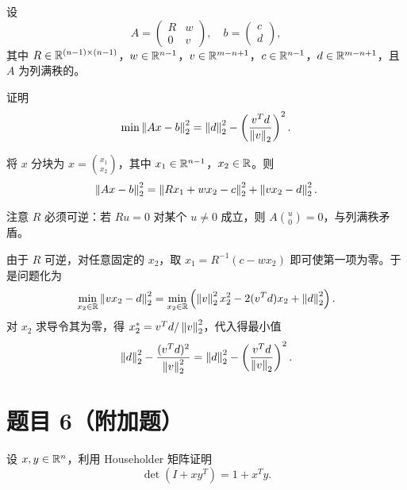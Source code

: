 \documentclass{article}
\begin{document}
设
\[
  A =
  \begin{pmatrix} R & w \\ 0 & v
  \end{pmatrix}, \quad
  b =
  \begin{pmatrix} c \\ d
  \end{pmatrix},
\]
其中 $R \in \mathbb{R}^{(n-1) \times (n-1)}$，$w \in \mathbb{R}^{n-1}$，$v \in
\mathbb{R}^{m-n+1}$，$c \in \mathbb{R}^{n-1}$，$d \in \mathbb{R}^{m-n+1}$，且 $A$ 为列满秩的。

证明
\[
  \min \left\| Ax - b \right\|_2^2 = \left\| d \right\|_2^2 - \left(\frac{v^T
  d}{\left\| v \right\|_2}\right)^2.
\]

\begin{solution}

  将 $x$ 分块为 $x = \binom{x_1}{x_2}$，其中 $x_1 \in \mathbb{R}^{n-1}$，$x_2 \in \mathbb{R}$。则
  \[
    \left\| Ax - b \right\|_2^2 = \left\| Rx_1 + wx_2 - c \right\|_2^2 + \left\| vx_2 - d \right\|_2^2.
  \]

  注意 $R$ 必须可逆：若 $Ru = 0$ 对某个 $u \neq 0$ 成立，则 $A\binom{u}{0} = 0$，与列满秩矛盾。

  由于 $R$ 可逆，对任意固定的 $x_2$，取 $x_1 = R^{-1}(c - wx_2)$ 即可使第一项为零。于是问题化为
  \[
    \min_{x_2 \in \mathbb{R}} \left\| vx_2 - d \right\|_2^2
    = \min_{x_2 \in \mathbb{R}} \left( \left\| v \right\|_2^2 x_2^2 - 2(v^T d) x_2 +
    \left\| d \right\|_2^2 \right).
  \]
  对 $x_2$ 求导令其为零，得 $x_2^* = v^T d / \left\| v \right\|_2^2$，代入得最小值
  \[
    \left\| d \right\|_2^2 - \frac{(v^T d)^2}{\left\| v \right\|_2^2}
    = \left\| d \right\|_2^2 - \left(\frac{v^T d}{\left\| v \right\|_2}\right)^2.
  \]

\end{solution}

\section{题目 6（附加题）}

设 $x, y \in \mathbb{R}^n$，利用 Householder 矩阵证明
\[
  \det(I + xy^T) = 1 + x^T y.
\]
\end{document}
